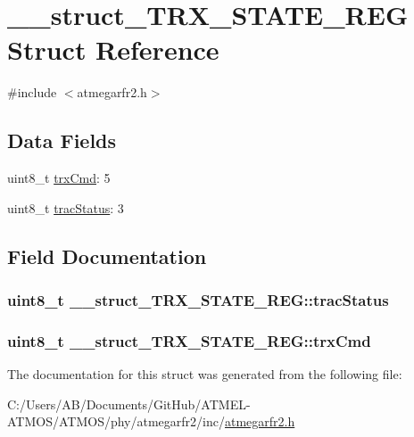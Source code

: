 \hypertarget{struct____struct___t_r_x___s_t_a_t_e___r_e_g}{\section{\-\_\-\-\_\-struct\-\_\-\-T\-R\-X\-\_\-\-S\-T\-A\-T\-E\-\_\-\-R\-E\-G Struct Reference}
\label{struct____struct___t_r_x___s_t_a_t_e___r_e_g}
}


{\ttfamily \#include $<$atmegarfr2.\-h$>$}

\subsection*{Data Fields}
\begin{DoxyCompactItemize}
\item 
uint8\-\_\-t \hyperlink{struct____struct___t_r_x___s_t_a_t_e___r_e_g_a3c690b179efc84dc57e91133cfde225c}{trx\-Cmd}\-: 5
\item 
uint8\-\_\-t \hyperlink{struct____struct___t_r_x___s_t_a_t_e___r_e_g_accf2bc0b6fb29902bbebc42ffddacd82}{trac\-Status}\-: 3
\end{DoxyCompactItemize}


\subsection{Field Documentation}
\hypertarget{struct____struct___t_r_x___s_t_a_t_e___r_e_g_accf2bc0b6fb29902bbebc42ffddacd82}{
\subsubsection[{trac\-Status}]{\setlength{\rightskip}{0pt plus 5cm}uint8\-\_\-t \-\_\-\-\_\-struct\-\_\-\-T\-R\-X\-\_\-\-S\-T\-A\-T\-E\-\_\-\-R\-E\-G\-::trac\-Status}}\label{struct____struct___t_r_x___s_t_a_t_e___r_e_g_accf2bc0b6fb29902bbebc42ffddacd82}
\hypertarget{struct____struct___t_r_x___s_t_a_t_e___r_e_g_a3c690b179efc84dc57e91133cfde225c}{
\subsubsection[{trx\-Cmd}]{\setlength{\rightskip}{0pt plus 5cm}uint8\-\_\-t \-\_\-\-\_\-struct\-\_\-\-T\-R\-X\-\_\-\-S\-T\-A\-T\-E\-\_\-\-R\-E\-G\-::trx\-Cmd}}\label{struct____struct___t_r_x___s_t_a_t_e___r_e_g_a3c690b179efc84dc57e91133cfde225c}


The documentation for this struct was generated from the following file\-:\begin{DoxyCompactItemize}
\item 
C\-:/\-Users/\-A\-B/\-Documents/\-Git\-Hub/\-A\-T\-M\-E\-L-\/\-A\-T\-M\-O\-S/\-A\-T\-M\-O\-S/phy/atmegarfr2/inc/\hyperlink{atmegarfr2_8h}{atmegarfr2.\-h}\end{DoxyCompactItemize}
